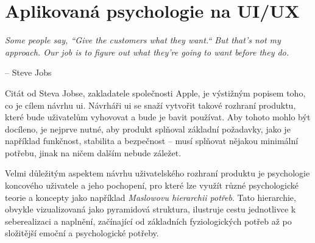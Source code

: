 \pagebreak
\section{Aplikovaná psychologie na UI/UX}
\label{sec:navrh-uzivatelskeho-rozhrani-psychologie}

\setlength{}
\epigraph{\textit{Some people say, ``Give the customers what they want.`` But that's not my approach. Our job is to figure out what they're going to want before they do.}}{-- Steve Jobs}

Citát od Steva Jobse, zakladatele společnosti Apple, je výstižným popisem toho, co je cílem návrhu \ac{ui}.
Návrháři \ac{ui} se snaží vytvořit takové rozhraní produktu, které bude uživatelům vyhovovat a bude je bavit používat.
Aby tohoto mohlo být docíleno, je nejprve nutné, aby produkt splňoval základní požadavky, jako je například funkčnost, stabilita a bezpečnost – musí splňovat nějakou minimální potřebu, jinak na ničem dalším nebude záležet\cite{bradley_hierarchy_of_needs}.

Velmi důležitým aspektem návrhu uživatelského rozhraní produktu je psychologie koncového uživatele a jeho pochopení, pro které lze využít různé psychologické teorie a koncepty jako například \textit{Maslowovu hierarchii potřeb}.
Tato hierarchie, obvykle vizualizovaná jako pyramidová struktura, ilustruje cestu jednotlivce k seberealizaci a naplnění, začínající od základních fyziologických potřeb až po složitější emoční a psychologické potřeby\cite{maslow_motivace_osobnost}.

